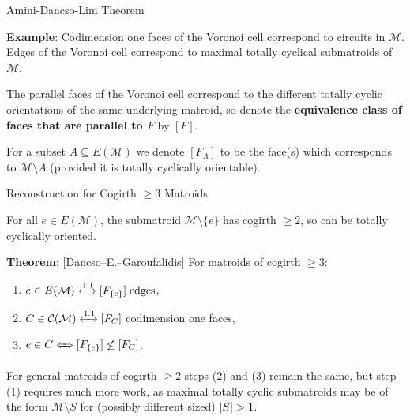 \documentclass[9pt]{beamer}
\def\calM{\mathcal M}
\def\calC{\mathcal C}
\renewcommand{\theorem}[1]{\vspace{6pt}\textbf{Theorem}: #1\vspace{6pt}}
\renewcommand{\example}[1]{\textbf{Example}: #1}
\DeclarePairedDelimiter\abs{\lvert}{\rvert}
\begin{document}
    \begin{frame}{Amini-Dancso-Lim Theorem}

        \example{Codimension one faces of the Voronoi cell correspond to circuits in $\calM$.
        Edges of the Voronoi cell correspond to maximal totally cyclical submatroids of $\calM$.}

        \pause

        \vspace{12pt}

        The parallel faces of the Voronoi cell correspond to the different totally cyclic orientations of the same underlying matroid, so denote the \textbf{equivalence class of faces that are parallel to $F$} by $[F]$.

        \vspace{12pt}

        For a subset $A\subseteq E(\calM)$ we denote $[F_A]$ to be the face(s) which corresponds to $\calM\setminus A$ (provided it is totally cyclically orientable).
        
    \end{frame}

    \begin{frame}{Reconstruction for Cogirth $\geq3$ Matroids}

        For all $e\in E(\calM)$, the submatroid $\calM\setminus\{e\}$ has cogirth $\geq2$, so can be totally cyclically oriented.

        \vspace{12pt}

        \theorem{[Dancso--E.--Garoufalidis] For matroids of cogirth $\geq3$:}

        \pause

        \vspace{-6pt}
        
        \begin{enumerate}
            \item $e\in E(\calM)\xleftrightarrow{1:1}[F_{\{e\}}]\;\text{edges}$,\pause
            \item $C\in\calC(\calM)\xleftrightarrow{1:1}[F_C]$ codimension one faces,\pause
            \item $e\in C\xLeftrightarrow{\textcolor{white}{::}} [F_{\{e\}}]\not\leq [F_C]$.\pause
        \end{enumerate}

        \vspace{12pt}

        For general matroids of cogirth $\geq2$ steps (2) and (3) remain the same, but step (1) requires much more work, as maximal totally cyclic submatroids may be of the form $\calM\setminus S$ for (possibly different sized) $\abs*{S}>1$.
        
    \end{frame}
\end{document}
